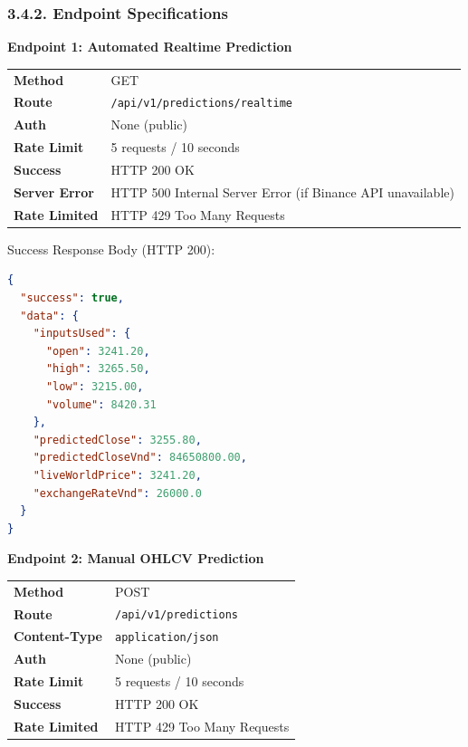 \subsubsection{3.4.2. Endpoint Specifications}

\textbf{Endpoint 1: Automated Realtime Prediction}

\begin{center}
\begin{tabular}{|l|l|}
\hline
\textbf{Method} & GET\\
\textbf{Route} & \texttt{/api/v1/predictions/realtime}\\
\textbf{Auth} & None (public)\\
\textbf{Rate Limit} & 5 requests / 10 seconds\\
\textbf{Success} & HTTP 200 OK\\
\textbf{Server Error} & HTTP 500 Internal Server Error (if Binance API unavailable)\\
\textbf{Rate Limited} & HTTP 429 Too Many Requests\\
\hline
\end{tabular}
\end{center}

Success Response Body (HTTP 200):
\begin{lstlisting}[language=json, numbers=none]
{
  "success": true,
  "data": {
    "inputsUsed": {
      "open": 3241.20,
      "high": 3265.50,
      "low": 3215.00,
      "volume": 8420.31
    },
    "predictedClose": 3255.80,
    "predictedCloseVnd": 84650800.00,
    "liveWorldPrice": 3241.20,
    "exchangeRateVnd": 26000.0
  }
}
\end{lstlisting}

\textbf{Endpoint 2: Manual OHLCV Prediction}

\begin{center}
\begin{tabular}{|l|l|}
\hline
\textbf{Method} & POST\\
\textbf{Route} & \texttt{/api/v1/predictions}\\
\textbf{Content-Type} & \texttt{application/json}\\
\textbf{Auth} & None (public)\\
\textbf{Rate Limit} & 5 requests / 10 seconds\\
\textbf{Success} & HTTP 200 OK\\
\textbf{Rate Limited} & HTTP 429 Too Many Requests\\
\hline
\end{tabular}
\end{center}

